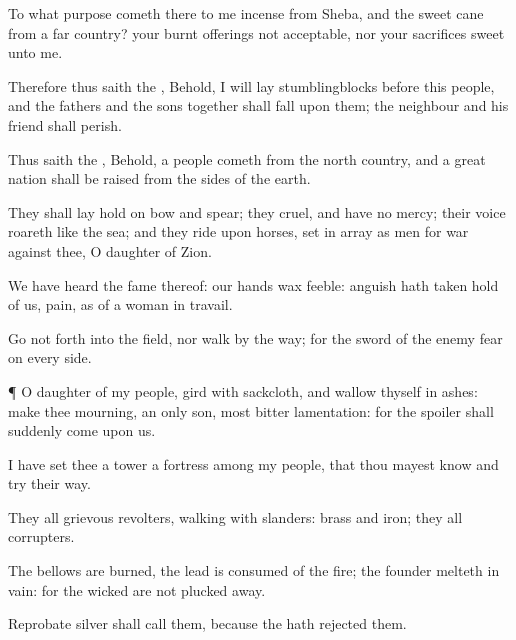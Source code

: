 {To what purpose
cometh there to me
incense from
Sheba, and the
sweet
cane from a
far
country? your burnt
offerings
{} not
acceptable, nor your
sacrifices
sweet unto me.

Therefore thus
saith the
{}, Behold, I will
lay
stumblingblocks before this
people, and the
fathers and the
sons
together shall
fall upon them; the
neighbour and his
friend shall
perish.

Thus
saith the
{}, Behold, a
people
cometh from the
north
country, and a
great
nation shall be
raised from the
sides of the
earth.

They shall lay
hold on
bow and
spear; they
{}
cruel, and have no
mercy; their
voice
roareth like the
sea; and they
ride upon
horses, set in
array as
men for
war against thee, O
daughter of
Zion.

We have
heard the
fame thereof: our
hands wax
feeble:
anguish hath taken
hold of us,
{}
pain, as of a woman in
travail.

Go not
forth into the
field, nor
walk by the
way; for the
sword of the
enemy
{}
fear
{} on every
side.


\par }{\PP {}¶ O
daughter of my
people,
gird
{} with
sackcloth, and
wallow thyself in
ashes:
make thee
mourning,
{} an only
son, most
bitter
lamentation: for the
spoiler shall
suddenly
come upon us.

I have
set thee
{} a
tower
{} a
fortress among my
people, that thou mayest
know and
try their
way.

They
{} all
grievous
revolters,
walking with
slanders:
{}
brass and
iron; they
{} all
corrupters.

The
bellows are
burned, the
lead is
consumed of the
fire; the
founder
melteth in
vain: for the
wicked are not plucked
away.

Reprobate
silver shall
{}
call them, because the
{} hath
rejected them.




\par }
